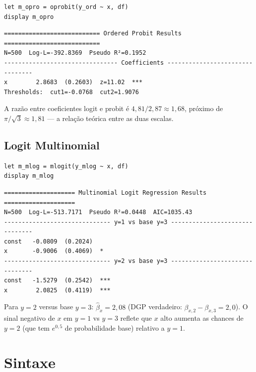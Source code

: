 \begin{lstlisting}
let m_opro = oprobit(y_ord ~ x, df)
display m_opro
\end{lstlisting}

\begin{lstlisting}[language={}, basicstyle=\ttfamily\small,
  frame=none, numbers=none, backgroundcolor=\color{codbg},
  xleftmargin=0pt, xrightmargin=0pt, breaklines=false]
=========================== Ordered Probit Results ===========================
N=500  Log-L=-392.8369  Pseudo R²=0.1952
-------------------------------- Coefficients --------------------------------
x        2.8683  (0.2603)  z=11.02  ***
Thresholds:  cut1=-0.0768  cut2=1.9076
\end{lstlisting}

A razão entre coeficientes logit e probit é $4{,}81/2{,}87 \approx 1{,}68$,
próximo de $\pi/\sqrt{3} \approx 1{,}81$ — a relação teórica entre as duas
escalas.

\subsection*{Logit Multinomial}

\begin{lstlisting}
let m_mlog = mlogit(y_mlog ~ x, df)
display m_mlog
\end{lstlisting}

\begin{lstlisting}[language={}, basicstyle=\ttfamily\small,
  frame=none, numbers=none, backgroundcolor=\color{codbg},
  xleftmargin=0pt, xrightmargin=0pt, breaklines=false]
==================== Multinomial Logit Regression Results ====================
N=500  Log-L=-513.7171  Pseudo R²=0.0448  AIC=1035.43
------------------------------ y=1 vs base y=3 -------------------------------
const   -0.0809  (0.2024)
x       -0.9006  (0.4069)  *
------------------------------ y=2 vs base y=3 -------------------------------
const   -1.5279  (0.2542)  ***
x        2.0825  (0.4119)  ***
\end{lstlisting}

Para $y=2$ versus base $y=3$: $\hat\beta_x = 2{,}08$ (DGP verdadeiro: $\beta_{x,2} - \beta_{x,3} = 2{,}0$). O sinal negativo de $x$ em $y=1$ vs $y=3$ reflete que $x$ alto aumenta as chances de $y=2$ (que tem $e^{0{,}5}$ de probabilidade base) relativo a $y=1$.

\section{Sintaxe}

